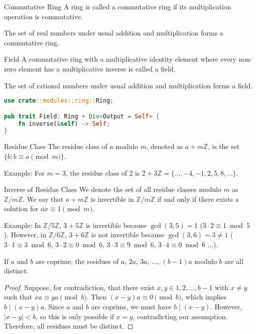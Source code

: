 \documentclass{article}
\begin{document}
\begin{definition}{Commutative Ring}{}
A ring is called a commutative ring if its multiplication operation is commutative.
\end{definition}

The set of real numbers under usual addition and multiplication forms a commutative ring.

\begin{definition}{Field}{}
A commutative ring with a multiplicative identity element where every non-zero element has a multiplicative inverse is called a field.
\end{definition}

The set of rational numbers under usual addition and multiplication forms a field.

\begin{lstlisting}[language=Rust, caption=Implementation of Field]
use crate::modules::ring::Ring;

pub trait Field: Ring + Div<Output = Self> {
    fn inverse(&self) -> Self;
}
\end{lstlisting}

\begin{definition}{Residue Class}{}
The residue class of $a$ modulo $m$, denoted as $a + m\mathbb{Z}$, is the set $\{b : b \equiv a \pmod{m}\}$.
\end{definition}

Example: For $m = 3$, the residue class of 2 is $2 + 3\mathbb{Z} = \{\ldots, -4, -1, 2, 5, 8, \ldots\}$.

\begin{definition}{Inverse of Residue Class}{}
We denote the set of all residue classes modulo $m$ as $\mathbb{Z} / m\mathbb{Z}$. We say that $a + m\mathbb{Z}$ is invertible in $\mathbb{Z} / m\mathbb{Z}$ if and only if there exists a solution for $ax \equiv 1 \pmod{m}$.
\end{definition}

Example: In $\mathbb{Z}/5\mathbb{Z}$, $3 + 5\mathbb{Z}$ is invertible because $\gcd(3, 5) = 1$ ($3\cdot2 \equiv 1 \bmod 5$). However, in $\mathbb{Z}/6\mathbb{Z}$, $3 + 6\mathbb{Z}$ is not invertible because $\gcd(3, 6) = 3 \neq 1$ ($3 \cdot 1 \equiv 3 \bmod 6$, $3 \cdot 2 \equiv 0 \bmod 6$, $3 \cdot 3 \equiv 9 \bmod 6$, $3 \cdot 4 \equiv 0 \bmod 6$ ...).

\begin{lemma}{}{}
If $a$ and $b$ are coprime, the residues of $a$, $2a$, $3a$, ..., $(b-1)a$ modulo $b$ are all distinct.
\end{lemma}
\begin{proof}
Suppose, for contradiction, that there exist $x, y \in {1, 2, ..., b-1}$ with $x \neq y$ such that $xa \equiv ya \pmod{b}$. Then $(x-y)a \equiv 0 \pmod{b}$, which implies $b \mid (x-y)a$. Since $a$ and $b$ are coprime, we must have $b \mid (x-y)$. However, $|x-y| < b$, so this is only possible if $x = y$, contradicting our assumption. Therefore, all residues must be distinct.
\end{proof}
\end{document}
